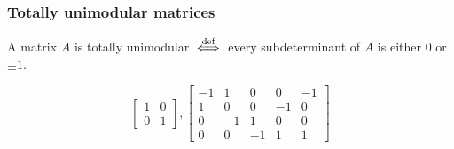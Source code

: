 \documentclass[14pt,aspectratio=169,xcolor=dvipsnames,table,onlytextwidth]{beamer}
\begin{document}
\begin{frame}
    \frametitle{Totally unimodular matrices}
    \begin{definition}
        A matrix $A$ is \alert{totally unimodular}
        $\overset{\text{def}}{\iff}$ every subdeterminant of $A$ is either $0$ or $\pm 1$.
    \end{definition}

    \begin{example}
        \[
            \begin{bmatrix}
                1 & 0 \\
                0 & 1
            \end{bmatrix},
            \begin{bmatrix}
                -1 &  1 &  0 & 0  & -1 \\
                1  &  0 &  0 & -1 & 0  \\
                0  & -1 &  1 & 0  & 0  \\
                0  &  0 & -1 & 1  & 1  
            \end{bmatrix} 
        \]
    \end{example}
\end{frame}
\end{document}
